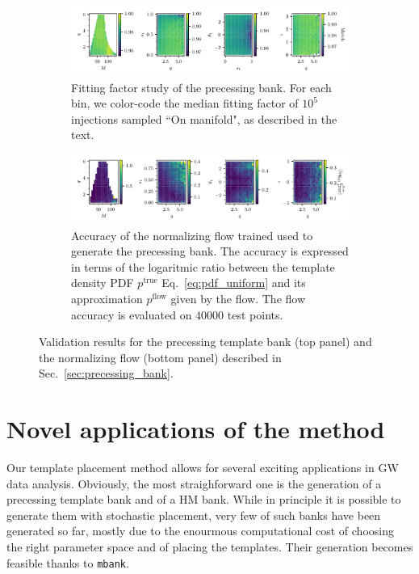 \documentclass[twocolumn,showpacs,preprintnumbers,nofootinbib,prd,
superscriptaddress,10pt]{revtex4-2}
\begin{document}
\begin{figure}[t]
	\centering
	\begin{subfigure}[t]{\textwidth}
		\includegraphics[scale = 1.]{precessing_injections}
		\caption{Fitting factor study of the precessing bank. For each bin, we color-code the median fitting factor of $10^5$ injections sampled ``On manifold", as described in the text.}
	\end{subfigure}
	\begin{subfigure}[t]{\textwidth}
		\includegraphics[scale = 1.]{precessing_flow_accuracy}
		\caption{Accuracy of the normalizing flow trained used to generate the precessing bank. The accuracy is expressed in terms of the logaritmic ratio between the template density PDF $p^\text{true}$ Eq.~\eqref{eq:pdf_uniform} and its approximation $p^\text{flow}$ given by the flow. The flow accuracy is evaluated on $40000$ test points.}
	\end{subfigure}
	\caption{Validation results for the precessing template bank (top panel) and the normalizing flow (bottom panel) described in Sec.~\ref{sec:precessing_bank}.}
	\label{fig:precessing_injections}
\end{figure}

\section{Novel applications of the method} \label{sec:novel_applications}

Our template placement method allows for several exciting applications in GW data analysis.
Obviously, the most straighforward one is the generation of a precessing template bank and of a HM bank. While in principle it is possible to generate them with stochastic placement, very few of such banks have been generated so far, mostly due to the enourmous computational cost of choosing the right parameter space and of placing the templates. Their generation becomes feasible thanks to \texttt{mbank}.
\end{document}
